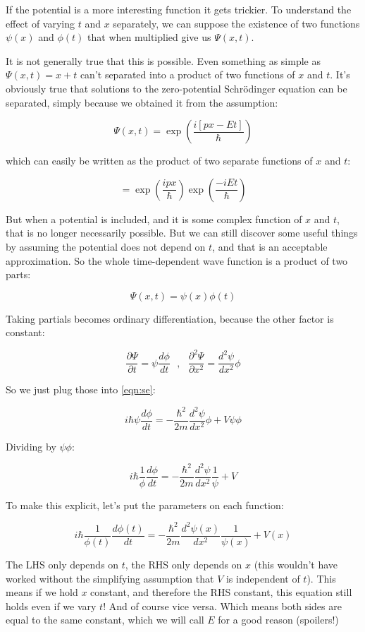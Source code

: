 If the potential is a more interesting function it gets trickier. To understand the effect of varying $t$ and $x$ separately, we can suppose the existence of two functions $\psi(x)$ and $\phi(t)$ that when multiplied give us $\Psi(x, t)$.

It is not generally true that this is possible. Even something as simple as $\Psi(x, t) = x + t$ can't separated into a product of two functions of $x$ and $t$. It's obviously true that solutions to the zero-potential Schrödinger equation can be separated, simply because we obtained it from the assumption:

$$
\Psi(x, t) = \exp \left( {\frac{i[px - Et]}{\hbar}} \right)
$$

which can easily be written as the product of two separate functions of $x$ and $t$:

$$
= \exp \left( {\frac{ipx}{\hbar}} \right)
\exp \left( {\frac{-iEt}{\hbar}} \right)
$$

But when a potential is included, and it is some complex function of $x$ and $t$, that is no longer necessarily possible. But we can still discover some useful things by assuming the potential does not depend on $t$, and that is an acceptable approximation. So the whole time-dependent wave function is a product of two parts:

$$\Psi(x, t) = \psi(x) \phi(t)$$

Taking partials becomes ordinary differentiation, because the other factor is constant:

$$
\frac{\partial \Psi}{\partial t}
= \psi \frac{d \phi}{d t}
\,\,\,\, , \,\,\,\,
\frac{\partial^2 \Psi}{\partial x^2}
= \frac{d^2 \psi}{d x^2}  \phi
$$

So we just plug those into \eqref{eqn:se}:

$$
i\hbar
\psi \frac{d \phi}{d t}
=
- \frac{\hbar^2}{2m}
\frac{d^2 \psi}{d x^2}  \phi
+ V \psi \phi
$$

Dividing by $\psi \phi$:

$$
i\hbar
\frac{1}{\phi}
\frac{d \phi}{d t}
=
- \frac{\hbar^2}{2m}
\frac{d^2 \psi}{d x^2}
\frac{1}{\psi}
+ V
$$

To make this explicit, let's put the parameters on each function:

$$
i\hbar
\frac{1}{\phi(t)}
\frac{d \phi(t)}{d t}
=
- \frac{\hbar^2}{2m}
\frac{d^2 \psi(x)}{d x^2}
\frac{1}{\psi(x)}
+ V(x)
$$

The LHS only depends on $t$, the RHS only depends on $x$ (this wouldn't have worked without the simplifying assumption that $V$ is independent of $t$). This means if we hold $x$ constant, and therefore the RHS constant, this equation still holds even if we vary $t$! And of course vice versa. Which means both sides are equal to the same constant, which we will call $E$ for a good reason (spoilers!)

